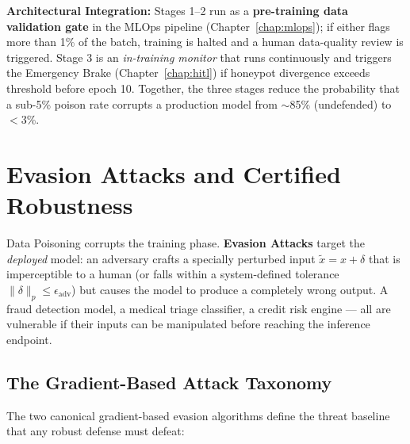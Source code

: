 \begin{svgraybox}
\textbf{Architectural Integration:} Stages 1--2 run as a \textbf{pre-training data validation gate} in the MLOps pipeline (Chapter~\ref{chap:mlops}); if either flags more than 1\% of the batch, training is halted and a human data-quality review is triggered. Stage 3 is an \emph{in-training monitor} that runs continuously and triggers the Emergency Brake (Chapter~\ref{chap:hitl}) if honeypot divergence exceeds threshold before epoch 10. Together, the three stages reduce the probability that a sub-5\% poison rate corrupts a production model from $\sim$85\% (undefended) to $<$3\%.
\end{svgraybox}

\section{Evasion Attacks and Certified Robustness}
\label{sec:evasion_attacks}

Data Poisoning corrupts the training phase. \textbf{Evasion Attacks} target the \emph{deployed} model: an adversary crafts a specially perturbed input $\tilde{x} = x + \delta$ that is imperceptible to a human (or falls within a system-defined tolerance $\|\delta\|_p \leq \epsilon_{\mathrm{adv}}$) but causes the model to produce a completely wrong output. A fraud detection model, a medical triage classifier, a credit risk engine — all are vulnerable if their inputs can be manipulated before reaching the inference endpoint.

\subsection{The Gradient-Based Attack Taxonomy}
\label{subsec:gradient_attacks}

The two canonical gradient-based evasion algorithms define the threat baseline that any robust defense must defeat:

